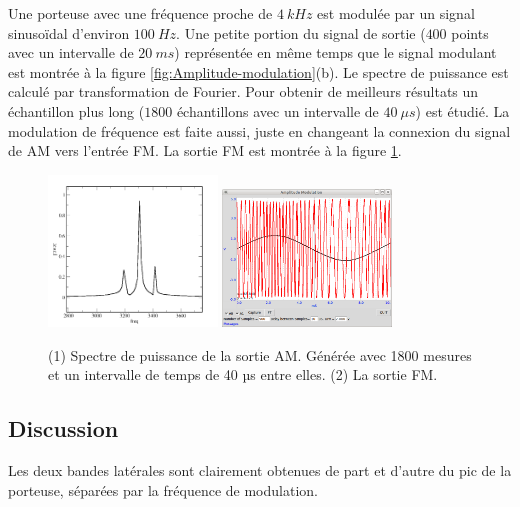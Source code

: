 \documentclass{book}
\begin{document}
Une porteuse avec une fréquence proche de $4\ kHz$ est modulée par un signal sinusoïdal d'environ $100\ Hz$. Une petite portion du signal de sortie ($400$ points avec un intervalle de $20\ ms$) représentée en même temps que le signal modulant est montrée à la figure  \ref{fig:Amplitude-modulation}(b). Le spectre de puissance est calculé par transformation de Fourier. Pour obtenir de meilleurs résultats un échantillon plus long ($1800$ échantillons avec un intervalle de $40\ \mu s$) est étudié. La modulation de fréquence est faite aussi, juste en changeant la connexion du signal de AM vers l'entrée FM. La sortie FM est montrée à la figure  \ref{fig:Amplitude-FT}.
\begin{figure}[h!]
\begin{center}
\caption{\label{fig:Amplitude-FT}(1) Spectre de puissance de la sortie AM. Générée avec 1800 mesures et un intervalle de temps de 40 µs entre elles. (2) La sortie FM. }\vspace{0.5em}
\includegraphics[width=0.4\textwidth, height=0.3\textwidth, keepaspectratio]{Schematic-AMfft-1800x40.png}
\includegraphics[width=0.4\textwidth, height=0.3\textwidth, keepaspectratio]{Pic-FMcarr-and-sig500x10-2V.png}
\end{center}
\end{figure}

\subsection{Discussion}


Les deux bandes latérales sont clairement obtenues de part et d'autre du pic de la porteuse, séparées par la fréquence de modulation.
\end{document}
